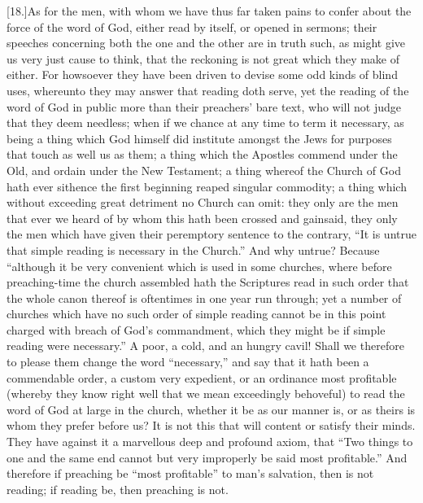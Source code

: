[18.]As for the men, with whom we have thus far taken pains to confer about the force of the word of God, either read by itself, or opened in sermons; their speeches concerning both the one and the other are in truth such, as might give us very just cause to think, that the reckoning is not great which they make of either. For howsoever they have been driven to devise some odd kinds of blind uses, whereunto they may answer that reading doth serve, yet the reading of the word of God in public more than their preachers’ bare text, who will not judge that they deem needless; when if we chance at any time to term it necessary, as being a thing which God himself did institute amongst the Jews for purposes that touch as well us as them; a thing which the Apostles commend under the Old, and ordain under the New Testament; a thing whereof the Church of God hath ever sithence the first beginning reaped singular commodity; a thing which without exceeding great detriment no Church can omit: they only are the  men that ever we heard of by whom this hath been crossed and gainsaid,
 they only the men which have given their peremptory sentence to the contrary, “It is untrue that simple reading is necessary in the Church.” And why untrue? Because “although it be very convenient which is used in some churches, where before preaching-time the church assembled hath the Scriptures read in such order that the whole canon thereof is oftentimes in one year run through; yet a number of churches which have no such order of simple reading cannot be in this point charged with breach of God’s commandment, which they might be if simple reading were necessary.” A poor, a cold, and an hungry cavil! Shall we therefore to please them change the word “necessary,” and say that it hath been a commendable order, a custom very expedient, or an ordinance most profitable (whereby they know right well that we mean exceedingly behoveful) to read the word of God at large in the church, whether it be as our manner is, or as theirs is whom they prefer before us? It is not this that will content or satisfy their minds. They have against it a marvellous deep and profound axiom, that “Two things to one and the same end cannot but very improperly be said most profitable.” And therefore if preaching be “most profitable” to man’s salvation, then is not reading; if reading be, then preaching is not.

